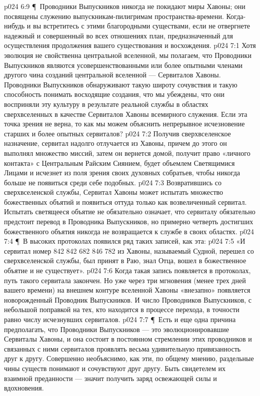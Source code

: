 \vs p024 6:9 \P\ Проводники Выпускников никогда не покидают миры Хавоны; они посвящены служению выпускникам\hyp{}пилигримам пространства\hyp{}времени. Когда\hyp{}нибудь и вы встретитесь с этими благородными существами, если не отвергнете надежный и совершенный во всех отношениях план, предназначенный для осуществления продолжения вашего существования и восхождения.
\vs p024 7:1 Хотя эволюция не свойственна центральной вселенной, мы полагаем, что Проводники Выпускников являются усовершенствованными или более опытными членами другого чина созданий центральной вселенной --- Сервиталов Хавоны. Проводники Выпускников обнаруживают такую широту сочувствия и такую способность понимать восходящие создания, что мы убеждены, что они восприняли эту культуру в результате реальной службы в областях сверхвселенных в качестве Сервиталов Хавоны всемирного служения. Если эта точка зрения не верна, то как мы можем объяснить непрерывное исчезновение старших и более опытных сервиталов?
\vs p024 7:2 Получив сверхвселенское назначение, сервитал надолго отлучается из Хавоны, причем до этого он выполнял множество миссий, затем он вернется домой, получит право «личного контакта» с Центральным Райским Сиянием, будет объемлем Светящимися Лицами и исчезнет из поля зрения своих духовных собратьев, чтобы никогда больше не появиться среди себе подобных.
\vs p024 7:3 Возвратившись со сверхвселенской службы, Сервитал Хавоны может испытать множество божественных объятий и появиться оттуда только как возвеличенный сервитал. Испытать светящееся объятие не обязательно означает, что сервиталу обязательно предстоит перевод в Проводника Выпускников, но примерно четверть достигших божественного объятия никогда не возвращается к службе в своих областях.
\vs p024 7:4 \P\ В высоких протоколах появился ряд таких записей, как эта:
\vs p024 7:5 «И сервитал номер 842 842 682 846 782 из Хавоны, называемый Судной, перешел со сверхвселенской службы, был принят в Раю, знал Отца, вошел в божественное объятие и не существует».
\vs p024 7:6 Когда такая запись появляется в протоколах, путь такого сервитала закончен. Но уже через три мгновения (менее трех дней вашего времени) на внешнем контуре вселенной Хавоны «внезапно» появляется новорожденный Проводник Выпускников. И число Проводников Выпускников, с небольшой поправкой на тех, кто находится в процессе перехода, в точности равно числу исчезнувших сервиталов.
\vs p024 7:7 \P\ Есть и еще одна причина предполагать, что Проводники Выпускников --- это эволюционировавшие Сервиталы Хавоны, и она состоит в постоянном стремлении этих проводников и связанных с ними сервиталов проявлять весьма удивительную привязанность друг к другу. Совершенно необъяснимо, как эти, по общему мнению, раздельные чины существ понимают и сочувствуют друг другу. Быть свидетелем их взаимной преданности --- значит получить заряд освежающей силы и вдохновения.
